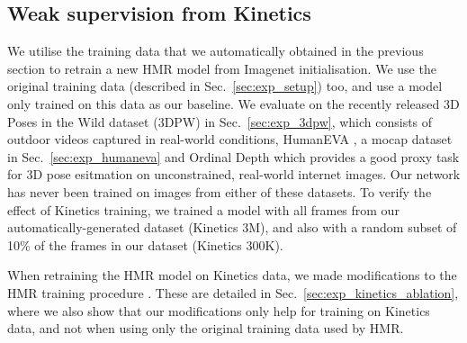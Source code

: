 \documentclass[10pt,twocolumn,letterpaper]{article}
\begin{document}
\setlength{\tabcolsep}{6pt}  
\subsection{Weak supervision from Kinetics}
\label{sec:exp_kinetics_training}

We utilise the training data that we automatically obtained in the previous section to retrain a new HMR model from Imagenet initialisation.
We use the original training data (described in Sec.~\ref{sec:exp_setup}) too, and use a model only trained on this data as our baseline.
We evaluate on the recently released 3D Poses in the Wild dataset (3DPW) \cite{von_marcard_eccv_2018} in Sec.~\ref{sec:exp_3dpw}, which consists of outdoor videos captured in real-world conditions, HumanEVA \cite{sigal_ijcv_2010}, a mocap dataset in Sec.~\ref{sec:exp_humaneva} and Ordinal Depth \cite{pavlakos_cvpr_2018b} which provides a good proxy task for 3D pose esitmation on unconstrained, real-world internet images.
Our network has never been trained on images from either of these datasets.
To verify the effect of Kinetics training, we trained a model with all frames from our automatically-generated dataset (Kinetics 3M), and also with a random subset of 10\% of the frames in our dataset (Kinetics 300K).

When retraining the HMR model on Kinetics data, we made modifications to the HMR training procedure \cite{kanazawa_cvpr_2018}.
These are detailed in Sec.~\ref{sec:exp_kinetics_ablation}, where we also show that our modifications only help for training on Kinetics data, and not when using only the original training data used by HMR.

\begin{table}[t]
	\caption{Results on the 3DPW \cite{von_marcard_eccv_2018}, HumanEVA \cite{sigal_ijcv_2010} and Ordinal Depth \cite{pavlakos_cvpr_2018b} datasets when training with our Kinetics datasets.
	We evaluate the HMR model retrained by us on its original training data using the author's public code, and the HMR model trained on its original data and 300K and 3M frames from our Kinetics dataset.
	For 3DPW and HumanEVA, we report the PA-MPJPE error in mm (lower is better), and for Ordinal Depth, we report the accuracy in \% (higher is better).
}
	\label{tab:kinetics_train_results}
\end{table} 
\end{document}
